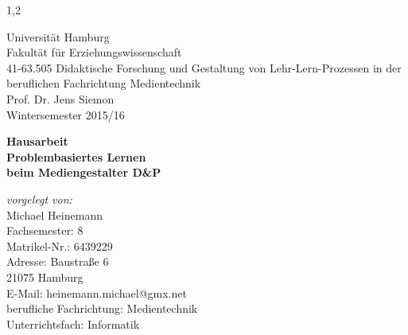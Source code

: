\begin{titlepage}
  \begin{spacing}{1,2}

\vspace{40pt}
Universität Hamburg\\
Fakultät für Erziehungswissenschaft\\
41-63.505 Didaktische Forschung und Gestaltung von Lehr-Lern-Prozessen in der beruflichen Fachrichtung Medientechnik\\
Prof. Dr. Jens Siemon\\
Wintersemester 2015/16\\[8em]


\begin{center}
{\Large \bf Hausarbeit}\\[1em]

{\bf \Large Problembasiertes Lernen}\\[0.5em]
{\bf \Large beim Mediengestalter D\&P}\\[15em]
\end{center}

\emph{vorgelegt von:}\\
Michael Heinemann\\
Fachsemester: 8\\
Matrikel-Nr.: 6439229\\
Adresse: Baustraße 6\\
\noindent\hspace*{15mm}%
		 21075 Hamburg\\
E-Mail: heinemann.michael@gmx.net\\
berufliche Fachrichtung: Medientechnik\\
Unterrichtsfach: Informatik

\end{spacing}
\end{titlepage}
